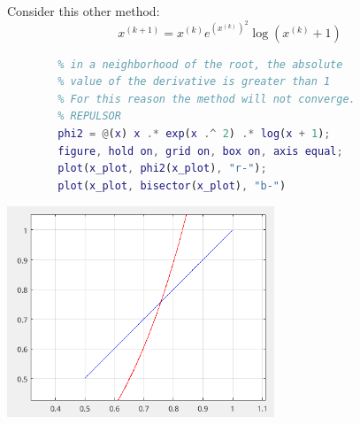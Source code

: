         Consider this other method:
        $$
        x^{(k+1)}=x^{(k)}e^{\left(x^{(k)}\right)^2}\log(x^{(k)}+1)
        $$
        \begin{lstlisting}[language=Matlab, escapeinside=`', gobble=8]
        % The comparison with the slope of the bisector shows that,
        % in a neighborhood of the root, the absolute
        % value of the derivative is greater than 1
        % For this reason the method will not converge.
        % REPULSOR
        phi2 = @(x) x .* exp(x .^ 2) .* log(x + 1);
        figure, hold on, grid on, box on, axis equal;
        plot(x_plot, phi2(x_plot), "r-");
        plot(x_plot, bisector(x_plot), "b-")
        \end{lstlisting}
        \begin{center}
            \includegraphics[width=0.6\textwidth]{images/code_fixed_bisector2.png}            
        \end{center}

